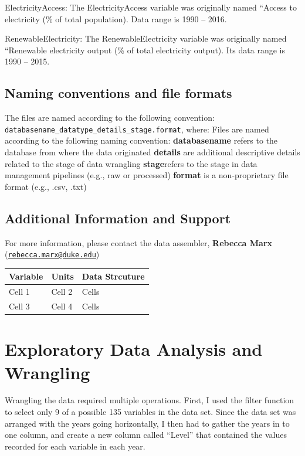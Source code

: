 \documentclass[12pt,]{article}
\begin{document}
ElectricityAccess: The ElectricityAccess variable was originally named
``Access to electricity (\% of total population). Data range is 1990 --
2016.

RenewableElectricity: The RenewableElectricity variable was originally
named ``Renewable electricity output (\% of total electricity output).
Its data range is 1990 -- 2015.

\subsection{Naming conventions and file
formats}\label{naming-conventions-and-file-formats}

The files are named according to the following convention:
\texttt{databasename\_datatype\_details\_stage.format}, where: Files are
named according to the following naming convention:
\textbf{databasename} refers to the database from where the data
originated \textbf{details} are additional descriptive details related
to the stage of data wrangling \textbf{stage}refers to the stage in data
management pipelines (e.g., raw or processed) \textbf{format} is a
non-proprietary file format (e.g., .csv, .txt)

\subsection{Additional Information and
Support}\label{additional-information-and-support}

For more information, please contact the data assembler, \textbf{Rebecca
Marx}
(\href{mailto:rebecca.marx@duke.edu}{\nolinkurl{rebecca.marx@duke.edu}})

\begin{longtable}[]{@{}lll@{}}
\toprule
Variable & Units & Data Strcuture\tabularnewline
\midrule
\endhead
Cell 1 & Cell 2 & Cells\tabularnewline
Cell 3 & Cell 4 & Cells\tabularnewline
\bottomrule
\end{longtable}

\newpage

\section{Exploratory Data Analysis and
Wrangling}\label{exploratory-data-analysis-and-wrangling}

Wrangling the data required multiple operations. First, I used the
filter function to select only 9 of a possible 135 variables in the data
set. Since the data set was arranged with the years going horizontally,
I then had to gather the years in to one column, and create a new column
called ``Level'' that contained the values recorded for each variable in
each year.
\end{document}
